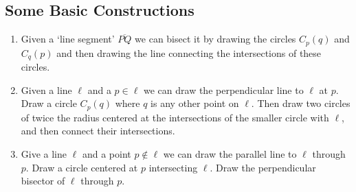 \subsection{Some Basic Constructions}

\begin{enumerate}
\item Given a `line segment' $\overline{PQ}$ we can bisect it by drawing the circles $C_p(q)$ and $C_q(p)$ and then drawing the line connecting the intersections of these circles.

\item Given a line $\ell$ and a $p \in \ell$ we can draw the perpendicular line to $\ell$ at $p$. Draw a circle $C_p(q)$ where $q$ is any other point on $\ell$. Then draw two circles of twice the radius centered at the intersections of the smaller circle with $\ell$, and then connect their intersections.

\item Give a line $\ell$ and a point $p \notin \ell$ we can draw the parallel line to $\ell$ through $p$. Draw a circle centered at $p$ intersecting $\ell$. Draw the perpendicular bisector of $\ell$ through $p$.
\end{enumerate}